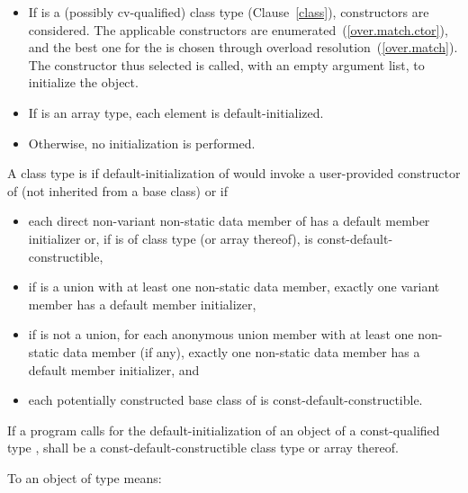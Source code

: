 \begin{itemize}
\item
If
is a (possibly cv-qualified) class type (Clause~\ref{class}),
constructors are considered. The applicable constructors are
enumerated~(\ref{over.match.ctor}), and the best one for the
 \tcode{()} is chosen through
overload resolution~(\ref{over.match}). The constructor thus selected
is called, with an empty argument list, to initialize the object.

\item
If
is an array type, each element is default-initialized.

\item
Otherwise,
no initialization is performed.
\end{itemize}

A class type  is  if
default-initialization of  would invoke
a user-provided constructor of  (not inherited from a base class)
or if

\begin{itemize}
\item
each direct non-variant non-static data member  of 
has a default member initializer
or, if  is of class type  (or array thereof),
 is const-default-constructible,
\item
if  is a union with at least one non-static data member,
exactly one variant member has a default member initializer,
\item
if  is not a union,
for each anonymous union member with at least one non-static data member (if any),
exactly one non-static data member has a default member initializer, and
\item
each potentially constructed base class of  is const-default-constructible.
\end{itemize}

If a program calls for the default-initialization of an object of a
const-qualified type ,
 shall be a const-default-constructible class type or array thereof.

\pnum
{}%
To
an object of type
means:


